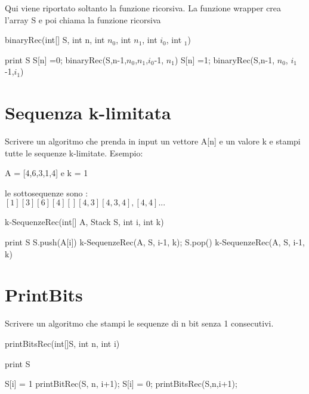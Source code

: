 \documentclass[oneside]{book}
\begin{document}
Qui viene riportato soltanto la funzione ricorsiva. La funzione wrapper crea l'array S e poi chiama la funzione ricorsiva 
\begin{algorithm}
\caption{binaryRec(int[] S, int n, int $n_0$, int $n_1$, int $i_0$, int $_1$)}
\begin{algorithmic}
	\State print S
\EndIf
{}
	\State S[n] =0;
	\State binaryRec(S,n-1,$n_0$,$n_1$,$i_0$-1, $n_1$)
\EndIf
{}
	\State S[n] =1;
	\State binaryRec(S,n-1, $n_0$, $i_1$-1,$i_1$)
\EndIf	
\end{algorithmic}
\end{algorithm}
\newpage
\section{Sequenza k-limitata}
Scrivere un algoritmo che prenda in input un vettore A[n] e un valore k e stampi tutte le sequenze k-limitate. Esempio: 

A = [4,6,3,1,4] e k = 1

le sottosequenze sono :\\
$[1][3][6][4][][4,3][4,3,4],[4,4] ...$

\begin{algorithm}
\caption{k-SequenzeRec(int[] A, Stack S, int i, int k)\label{alg:cap}}
\begin{algorithmic}

	\State print S
\Else
		\State S.push(A[i])
		\State k-SequenzeRec(A, S, i-1, k);
		\State S.pop()
	\EndIf
	\State k-SequenzeRec(A, S, i-1, k)

\EndIf
\end{algorithmic}
\end{algorithm}


\section{PrintBits}
Scrivere un algoritmo che stampi le sequenze di n bit senza 1 consecutivi.

\begin{algorithm}
\caption{printBitsRec(int[]S, int n, int i)\label{alg:cap}}
\begin{algorithmic}
	\State print S
\EndIf

	\State S[i] = 1
	\State printBitRec(S, n, i+1);
\Else
	\State S[i] = 0;
	\State printBitsRec(S,n,i+1);
\EndIf
\end{algorithmic}
\end{algorithm}
\newpage
\end{document}
